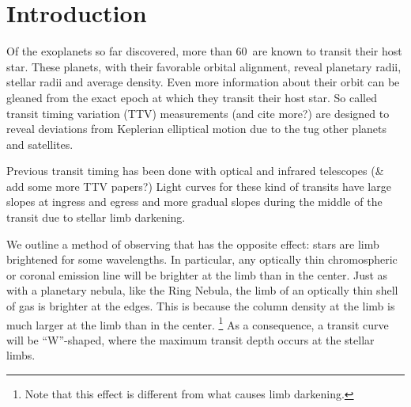 \documentclass[manuscript]{aastex}
\newcommand{\numt}{60}
\begin{document}

\section{Introduction}
Of the exoplanets so far discovered, more than \numt\ are known to
transit their host star. These planets, with their favorable orbital
alignment, reveal planetary radii, stellar radii and average
density. Even more information about their orbit can be gleaned from
the exact epoch at which they transit their host star. So called
transit timing variation (TTV) measurements
\citep{2005MNRAS.359..567A} (and cite more?) are designed to reveal
deviations from Keplerian elliptical motion due to the tug other
planets and satellites.

Previous transit timing has been done with optical and infrared
telescopes \citep{2004ApJ...613L.153A,2010A&A...510A.107M} (\&
add some more TTV papers?) Light curves for these kind of transits
have large slopes at ingress and egress and more gradual slopes during
the middle of the transit due to stellar limb darkening. 

We outline a method of observing that has the opposite
effect: stars are limb brightened for some wavelengths. In
particular, any optically thin chromospheric or coronal emission line will be
brighter at the limb than in the center. Just as with a planetary
nebula, like the Ring Nebula, the limb of an optically thin shell of
gas is brighter at the edges. This is because the column density at
the limb is much larger at the limb than in the center. \footnote{Note that this
effect is different from what causes limb darkening.} As a
consequence, a transit curve will be ``W''-shaped, where the maximum
transit depth occurs at the stellar limbs. 
\end{document}
